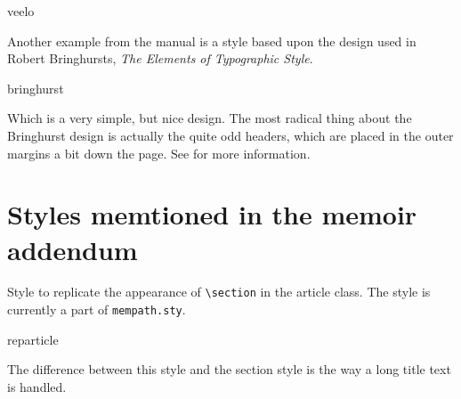 \begin{showchapterstyle}{veelo}
\makeatletter
\usepackage{graphicx}
\newlength{\numberheight}
\newlength{\barlength}
\makeatother
\end{showchapterstyle}


\bigskip

\noindent 
Another example from the manual is a style based upon the design used
in Robert Bringhursts, \emph{The Elements of Typographic Style}.
\begin{showchapterstyle}{bringhurst}
\end{showchapterstyle}
Which is a very simple, but nice design. The most radical thing about
the Bringhurst design is actually the quite odd headers, which are
placed in the outer margins a bit down the page. See \cite{memman} for
more information.



\section*{Styles memtioned in the memoir addendum}
\label{sec:styl-memt-memo}

Style to replicate the appearance of \verb+\section+ in the article
class. The style is currently a part of \texttt{mempath.sty}.
\begin{showchapterstyle}{reparticle}  
\end{showchapterstyle}
The difference between this style and the \textsf{section} style is
the way a long title text is handled. 

